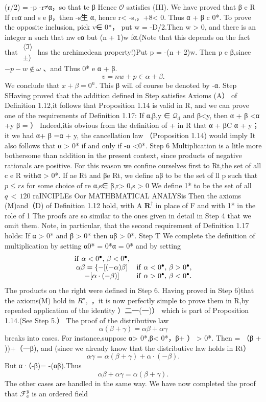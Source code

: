 (r/2) = -p -r≠α，so that te β Hence $\underline{{{\mathcal{O}}}}$ satisfies (III). We have proved that β e R If reα and s e β，then -s生 α, hence r< -s,，+8< 0. Thus α + β c 0*. To prove the opposite inclusion, pick v∈ 0*， put w = -D/2.Then w > 0, and there is an integer n such that nw eα but (n + 1)w fα.(Note that this depends on the fact that $\begin{array}{c}{{\langle\Im\rangle}}\\ {{\pm\rangle}}\end{array}$ has the archimedean property!)Put p = -(n + 2)w. Then p e β,since $-p-w\not\in\omega$ 、and Thus 0* e α + β. $$ v=n w+p\in\alpha+\beta. $$ We conclude that $x+\beta=0^{n}.$ This β will of course be denoted by -α. Step SHaving proved that the addition defined in Step satisfies Axioms (A） of Definition 1.12,it follows that Proposition 1.14 is valid in R, and we can prove one of the requirements of Definition 1.17: If α,β,y ∈ ${\mathcal{Q}}_{\mathrm{d}}$ and β<y, then α + β <α +y β = ） Indeed,itis obvious from the definition of + in R that α + βC α + y； it we had α+ β =α + y, the cancellation law （Proposition 1.14) would imply It also follows that α > 0* if and only if -α <0*. Step 6 Multiplication is a litle more bothersome than addition in the present context, since products of negative rationals are positive. For this reason we confine ourselves first to Rt,the set of all c e R withα > 0*. If ae Rt and βe Rt, we define aβ to be the set of ll p such that $p\leq r s$ for some choice of re α,s∈ β,r> 0,s > 0 We define 1* to be the set of all $\scriptstyle q\,<\,1$20 raINCIPLEs Oor MATHBMATICAL ANALYSis Then the axioms (M)and（D) of Definition 1.12 hold, with A ${\boldsymbol{R}}^{\dagger}$ in place of F and with 1* in the role of 1 The proofs are so similar to the ones given in detail in Step 4 that we omit them. Note, in particular, that the second requirement of Definition 1.17 holds: If α > 0* and β > 0* then αβ > 0*. Step T We complete the definition of multiplication by setting α0* = 0*α = 0* and by setting $$ \begin{array}{c c}{{\mathrm{if~}\alpha<0^{\bullet},\,\beta<0^{\bullet},}}\\ {{\alpha\beta= \{-[(-\alpha)\beta]}}&{{\mathrm{if~}\alpha<0^{\bullet},\,\beta>0^{\bullet},}}\\ {{-[\alpha\cdot(-\beta)]}}&{{\mathrm{if~}\alpha>0^{\bullet},\,\beta<0^{\bullet}.}}\end{array} $$ The products on the right were defined in Step 6. Having proved in Step 6)that the axioms(M) hold in $R^{\star},$ ，it is now perfectly simple to prove them in R,by repeated application of the identity ）二一(一)） which is part of Proposition 1.14.(See Step 5.） The proof of the distributive law $$ \alpha(\beta+\gamma)=\alpha\beta+\alpha\gamma $$ breaks into cases. For instance,suppose α> 0*,β< 0*，β+ ） > 0*. Then = （β + ))+（一β), and (since we already know that the distributive law holds in Rt） $$ \alpha\gamma=\alpha(\beta+\gamma)+\alpha\cdot(-\beta). $$ But α·（-β)= -(αβ).Thus $$ \alpha\beta+\alpha\gamma=\alpha(\beta+\gamma). $$ The other cases are handled in the same way. We have now completed the proof that ${\mathcal{F}}_{\mathrm{e}}^{y}$ is an ordered field 